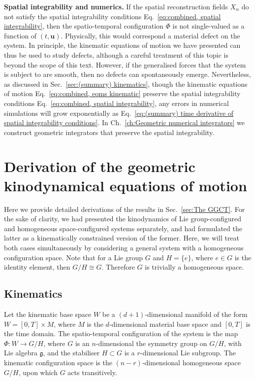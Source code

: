 \textbf{Spatial integrability and numerics.} If the spatial reconstruction fields $X_\alpha$ do not satisfy the spatial integrability conditions Eq.~\ref{eq:combined, spatial integrability}, then the spatio-temporal configuration $\Phi$ is not single-valued as a function of $(t, \mathbf{u})$. Physically, this would correspond a material defect on the system. In principle, the kinematic equations of motion we have presented can thus be used to study defects, although a careful treatment of this topic is beyond the scope of this text. However, if the generalised forces that the system is subject to are smooth, then no defects can spontaneously emerge. Nevertheless, as discussed in Sec.~\ref{sec:(summary) kinematics}, though the kinematic equations of motion Eq.~\ref{eq:combined, eoms kinematic} preserve the spatial integrability conditions Eq.~\ref{eq:combined, spatial integrability}, any errors in numerical simulations will grow exponentially as Eq.~\ref{eq:(summary) time derivative of spatial integrability conditions}. In Ch.~\ref{ch:Geometric numerical integrators} we construct geometric integrators that preserve the spatial integrability.

\section{Derivation of the geometric kinodynamical equations of motion}

Here we provide detailed derivations of the results in Sec.~\ref{sec:The GGCT}. For the sake of clarity, we had presented the kinodynamics of Lie group-configured and homogeneous space-configured systems separately, and had formulated the latter as a kinematically constrained version of the former. Here, we will treat both cases simultaneously by considering a general system with a homogeneous configuration space. Note that for a Lie group $G$ and $H = \{e\}$, where $e \in G$ is the identity element, then $G/H \cong G$. Therefore $G$ is trivially a homogeneous space.

\subsection{Kinematics} \label{sec:Geometric kinematics}

Let the kinematic base space $W$ be a $(d+1)$-dimensional manifold of the form $W = [0, T] \times M$, where $M$ is the $d$-dimensional material base space and $[0, T]$ is the time domain. The spatio-temporal configuration of the system is the map $\Phi : W \to G/H$, where $G$ is an $n$-dimensional the symmetry group on $G/H$, with Lie algebra $\mathfrak{g}$, and the stabiliser $H \subset G$ is a $r$-dimensional Lie subgroup. The kinematic configuration space is the $(n-r)$-dimensional homogeneous space $G/H$, upon which $G$ acts transitively.

